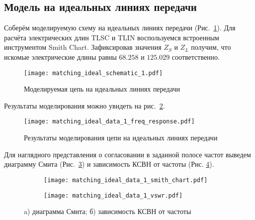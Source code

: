 \subsection{Модель на идеальных линиях передачи}

Соберём моделируемую схему на идеальных линиях передачи (Рис.~\ref{fig:matching_ideal_schematic_1}). Для расчёта электрических длин TLSC и TLIN воспользуемся встроенным инструментом Smith Chart. Зафиксировав значения $Z_S$ и $Z_L$ получим, что искомые электрические длины равны $68.258$ и $125.029$ соответственно.

\begin{figure}[!ht]
    \centering
    \texttt{[image: matching\_ideal\_schematic\_1.pdf]}
    \caption{Моделируемая цепь на идеальных линиях передачи}%
    \label{fig:matching_ideal_schematic_1}
\end{figure}

Результаты моделирования можно увидеть на рис.~\ref{fig:matching_ideal_data_1_freq_response}.

\begin{figure}[!ht]
    \centering
    \texttt{[image: matching\_ideal\_data\_1\_freq\_response.pdf]}
    \caption{Результаты моделирования цепи на идеальных линиях передачи}%
    \label{fig:matching_ideal_data_1_freq_response}
\end{figure}

Для наглядного представления о согласовании в заданной полосе частот выведем диаграмму Смита (Рис.~\ref{fig:matching_ideal_data_1_smith_chart}) и зависимость КСВН от частоты (Рис. \ref{fig:matching_ideal_data_1_vswr}).

\begin{figure}[!ht]
    \begin{subfigure}[b]{0.45\textwidth}
        \centering
        \texttt{[image: matching\_ideal\_data\_1\_smith\_chart.pdf]}
        \caption{}%
    \label{fig:matching_ideal_data_1_smith_chart}
    \end{subfigure}
    \hfill
    \begin{subfigure}[b]{0.45\textwidth}
        \centering
        \texttt{[image: matching\_ideal\_data\_1\_vswr.pdf]}
        \caption{}%
    \label{fig:matching_ideal_data_1_vswr}
    \end{subfigure}
    \caption{
        a) диаграмма Смита;
        б) зависимость КСВН от частоты
    }%
    \label{fig:matching_ideal_data_display_1}
\end{figure}

